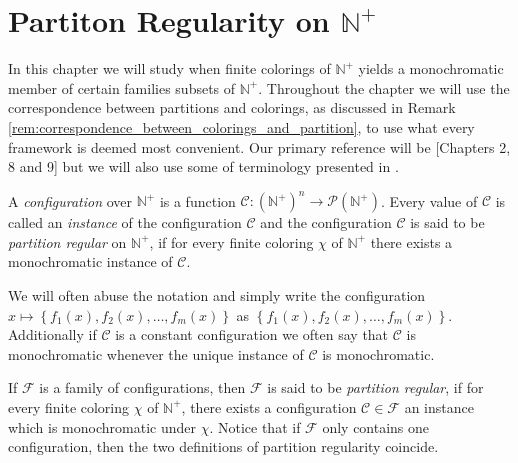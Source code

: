 \chapter{Partiton Regularity on $\mathbb{N}^{+}$}\label{chap:partition_regularity}
In this chapter we will study when finite colorings of $\mathbb{N}^{+}$ yields a monochromatic member of certain families subsets of $\mathbb{N}^+$. Throughout the chapter we will use the correspondence between partitions and colorings, as discussed in Remark \ref{rem:correspondence_between_colorings_and_partition}, to use what every framework is deemed most convenient. Our primary reference will be \cite{rtoi}[Chapters 2, 8 and 9] but we will also use some of terminology presented in \cite{exponential_ultrafilters_and_patterns_in_Ramsey_theory}.

\begin{definition}\label{def:partition_regularity}
	A \textit{configuration} over $\mathbb{N}^{+}$ is a function $\mathcal{C}: (\mathbb{N}^{+})^n \to \mathcal{P}(\mathbb{N}^{+})$. Every value of $\mathcal{C}$ is called an \textit{instance} of the configuration $\mathcal{C}$ and the configuration $\mathcal{C}$ is said to be \textit{partition regular} on $\mathbb{N}^{+}$, if for every finite coloring $\chi$ of $\mathbb{N}^{+}$ there exists a monochromatic instance of $\mathcal{C}$.
\end{definition}
\begin{remark}
	We will often abuse the notation and simply write the configuration $x \mapsto \left\{f_1(x), f_2(x), \ldots, f_{m}(x)\right\}$ as $\left\{f_1(x), f_2(x), \ldots, f_m(x)\right\}$. Additionally if $\mathcal{C}$ is a constant configuration we often say that $\mathcal{C}$ is monochromatic whenever the unique instance of $\mathcal{C}$ is monochromatic.
\end{remark}

If $\mathcal{F}$ is a family of configurations, then $\mathcal{F}$ is said to be \textit{partition regular}, if for every finite coloring $\chi$ of $\mathbb{N}^{+}$, there exists a configuration $\mathcal{C} \in \mathcal{F}$ an instance which is monochromatic under $\chi$. Notice that if $\mathcal{F}$ only contains one configuration, then the two definitions of partition regularity coincide.

